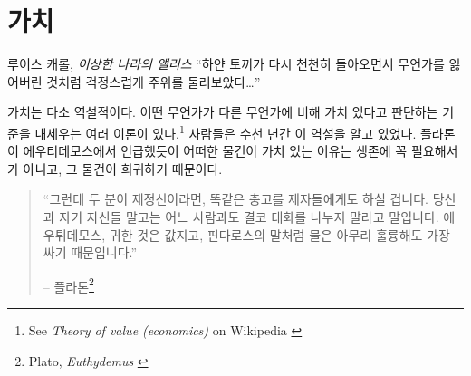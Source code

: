 \chapter{가치}
\label{les:10}

\begin{chapquote}{루이스 캐롤, \textit{이상한 나라의 앨리스}}
	\enquote{하얀 토끼가 다시 천천히 돌아오면서 무언가를 잃어버린 것처럼 걱정스럽게 주위를 둘러보았다\ldots}
\end{chapquote}

\begin{comment}
	Value is somewhat paradoxical, and there are multiple theories\footnote{See
		\textit{Theory of value (economics)} on Wikipedia \cite{wiki:theory-of-value}}
	which try to explain why we value certain things over other things. People have
	been aware of this paradox for thousands of years. As Plato wrote in his
	dialogue with Euthydemus, we value some things because they are rare, and not
	merely based on their necessity for our survival.
\end{comment}
가치는 다소 역설적이다. 
어떤 무언가가 다른 무언가에 비해 가치 있다고 판단하는 기준을 내세우는 여러 이론이 있다.\footnote{See
	\textit{Theory of value (economics)} on Wikipedia \cite{wiki:theory-of-value}}
사람들은 수천 년간 이 역설을 알고 있었다. 
플라톤이 에우티데모스에서 언급했듯이 어떠한 물건이 가치 있는 이유는 생존에 꼭 필요해서가 아니고,
그 물건이 희귀하기 때문이다.

\begin{quotation}\begin{samepage}
		\enquote{그런데 두 분이 제정신이라면, 똑같은 충고를 제자들에게도 하실 겁니다.
			당신과 자기 자신들 말고는 어느 사람과도 결코 대화를 나누지 말라고 말입니다.
			에우튀데모스, 귀한 것은 값지고, 핀다로스의 말처럼 물은 아무리 훌륭해도 가장 싸기 때문입니다.}
		\begin{flushright} -- 플라톤\footnote{Plato, \textit{Euthydemus} \cite{euthydemus}}
\end{flushright}\end{samepage}\end{quotation}

